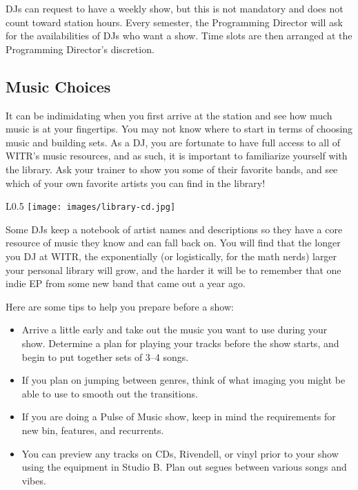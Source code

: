 \documentclass{witrman}
\begin{document}
DJs can request to have a weekly show, but this is not mandatory and does not
count toward station hours.  Every semester, the Programming Director will ask
for the availabilities of DJs who want a show.  Time slots are then arranged at
the Programming Director's discretion.


\subsection{Music Choices}

It can be indimidating when you first arrive at the station and see how much
music is at your fingertips.  You may not know where to start in terms of
choosing music and building sets.  As a DJ, you are fortunate to have full
access to all of WITR's music resources, and as such, it is important to
familiarize yourself with the library.  Ask your trainer to show you some of
their favorite bands, and see which of your own favorite artists you can find in
the library!

\begin{wrapfigure}{L}{0.5\linewidth}
    \texttt{[image: images/library-cd.jpg]}
\end{wrapfigure}

Some DJs keep a notebook of artist names and descriptions so they have a core
resource of music they know and can fall back on.  You will find that the longer
you DJ at WITR, the exponentially (or logistically, for the math nerds) larger
your personal library will grow, and the harder it will be to remember that one
indie EP from some new band that came out a year ago.

Here are some tips to help you prepare before a show:
\begin{itemize}
    \item Arrive a little early and take out the music you want to use during
        your show.  Determine a plan for playing your tracks before the show
        starts, and begin to put together sets of 3--4 songs.
    \item If you plan on jumping between genres, think of what imaging you might
        be able to use to smooth out the transitions.
    \item If you are doing a Pulse of Music show, keep in mind the requirements
        for new bin, features, and recurrents.
    \item You can preview any tracks on CDs, Rivendell, or vinyl prior to your
        show using the equipment in Studio B.  Plan out segues between various
        songs and vibes.
\end{itemize}
\end{document}
